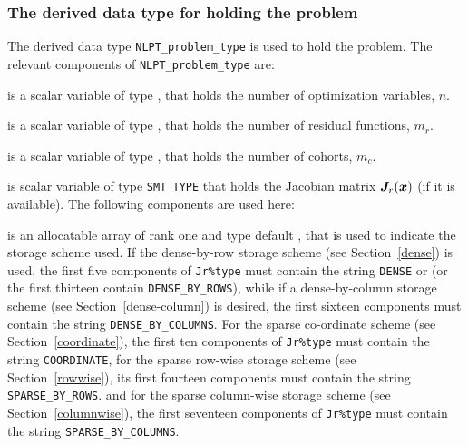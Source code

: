 \documentclass{galahad}
\begin{document}

\subsubsection{The derived data type for holding the problem}\label{typeprob}
The derived data type {\tt NLPT\_problem\_type} is used to hold
the problem. The relevant components of
{\tt NLPT\_problem\_type}
are:

\begin{description}

 is a scalar variable of type \integer,
 that holds the number of optimization variables, $n$.

 is a scalar variable of type \integer,
 that holds the number of residual functions, $m_r$.

 is a scalar variable of type \integer,
 that holds the number of cohorts, $m_c$.



 is scalar variable of type {\tt SMT\_TYPE}
that holds the Jacobian matrix ${\bm{J}}_r({\bm{x}})$ (if it is available).
The following components are used here:

\begin{description}

 is an allocatable array of rank one and type default
\character, that
is used to indicate the storage scheme used. If the dense-by-row storage scheme
(see Section~\ref{dense}) is used,
the first five components of {\tt Jr\%type} must contain the
string {\tt DENSE} or (or the first thirteen contain {\tt DENSE\_BY\_ROWS}), 
while if a  dense-by-column storage scheme (see Section~\ref{dense-column}) 
is desired, the first sixteen components must contain the string 
{\tt DENSE\_BY\_COLUMNS}.
For the sparse co-ordinate scheme (see Section~\ref{coordinate}),
the first ten components of {\tt Jr\%type} must contain the
string {\tt COORDINATE},
for the sparse row-wise storage scheme (see Section~\ref{rowwise}),
its first fourteen components must contain the
string {\tt SPARSE\_BY\_ROWS}.
and for the sparse column-wise storage scheme (see Section~\ref{columnwise}),
the first seventeen components of {\tt Jr\%type} must contain the
string {\tt SPARSE\_BY\_COLUMNS}.


\end{description}
\end{description}
\end{document}
